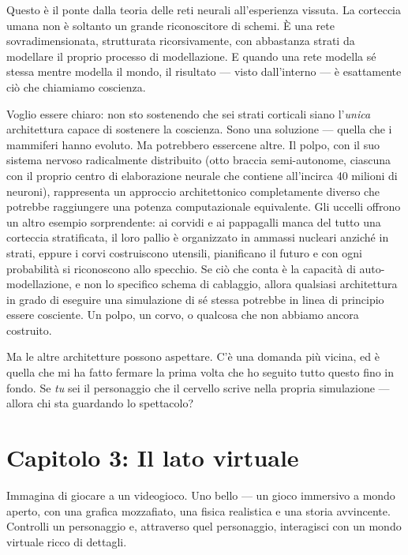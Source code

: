 \documentclass[11pt, twoside, openright]{book}
\begin{document}
Questo è il ponte dalla teoria delle reti neurali all'esperienza vissuta. La corteccia umana non è soltanto un grande riconoscitore di schemi. È una rete sovradimensionata, strutturata ricorsivamente, con abbastanza strati da modellare il proprio processo di modellazione. E quando una rete modella sé stessa mentre modella il mondo, il risultato --- visto dall'interno --- è esattamente ciò che chiamiamo coscienza.

Voglio essere chiaro: non sto sostenendo che sei strati corticali siano l'\textit{unica} architettura capace di sostenere la coscienza. Sono una soluzione --- quella che i mammiferi hanno evoluto. Ma potrebbero essercene altre. Il polpo, con il suo sistema nervoso radicalmente distribuito (otto braccia semi-autonome, ciascuna con il proprio centro di elaborazione neurale che contiene all'incirca 40 milioni di neuroni), rappresenta un approccio architettonico completamente diverso che potrebbe raggiungere una potenza computazionale equivalente. Gli uccelli offrono un altro esempio sorprendente: ai corvidi e ai pappagalli manca del tutto una corteccia stratificata, il loro pallio è organizzato in ammassi nucleari anziché in strati, eppure i corvi costruiscono utensili, pianificano il futuro e con ogni probabilità si riconoscono allo specchio. Se ciò che conta è la capacità di auto-modellazione, e non lo specifico schema di cablaggio, allora qualsiasi architettura in grado di eseguire una simulazione di sé stessa potrebbe in linea di principio essere cosciente. Un polpo, un corvo, o qualcosa che non abbiamo ancora costruito.

Ma le altre architetture possono aspettare. C'è una domanda più vicina, ed è quella che mi ha fatto fermare la prima volta che ho seguito tutto questo fino in fondo. Se \textit{tu} sei il personaggio che il cervello scrive nella propria simulazione --- allora chi sta guardando lo spettacolo?


\chapter*{Capitolo 3: Il lato virtuale}

Immagina di giocare a un videogioco. Uno bello --- un gioco immersivo a mondo aperto, con una grafica mozzafiato, una fisica realistica e una storia avvincente. Controlli un personaggio e, attraverso quel personaggio, interagisci con un mondo virtuale ricco di dettagli.
\end{document}
